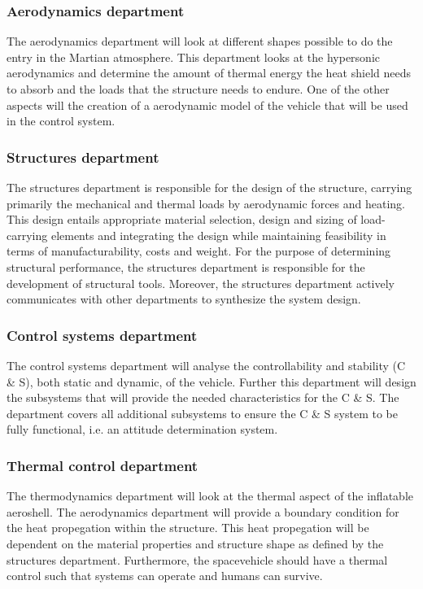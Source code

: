 \subsubsection{Aerodynamics department}\label{subsec:aero}
The aerodynamics department will look at different shapes possible to do the entry in the Martian atmosphere. This department looks at the hypersonic aerodynamics and determine the amount of thermal energy the heat shield needs to absorb and the loads that the structure needs to endure. One of the other aspects will the creation of a aerodynamic model of the vehicle that will be used in the control system.

\subsubsection{Structures department}\label{subsec:struct}
The structures department is responsible for the design of the structure, carrying primarily the mechanical and thermal loads by aerodynamic forces and heating. This design entails appropriate material selection, design and sizing of load-carrying elements and integrating the design while maintaining feasibility in terms of manufacturability, costs and weight. For the purpose of determining structural performance, the structures department is responsible for the development of structural tools. Moreover, the structures department actively communicates with other departments to synthesize the system design.

\subsubsection{Control systems department}\label{subsec:control}
The control systems department will analyse the controllability and stability (C \& S), both static and dynamic, of the vehicle. Further this department will design the subsystems that will provide the needed characteristics for the C \& S. The department covers all additional subsystems to ensure the C \& S system to be fully functional, i.e. an attitude determination system.


\subsubsection{Thermal control department}\label{subsec:therm}
The thermodynamics department will look at the thermal aspect of the inflatable aeroshell. The aerodynamics department will provide a boundary condition for the heat propegation within the structure. This heat propegation will be dependent on the material properties and structure shape as defined by the structures department. Furthermore, the spacevehicle should have a thermal control such that systems can operate and humans can survive.